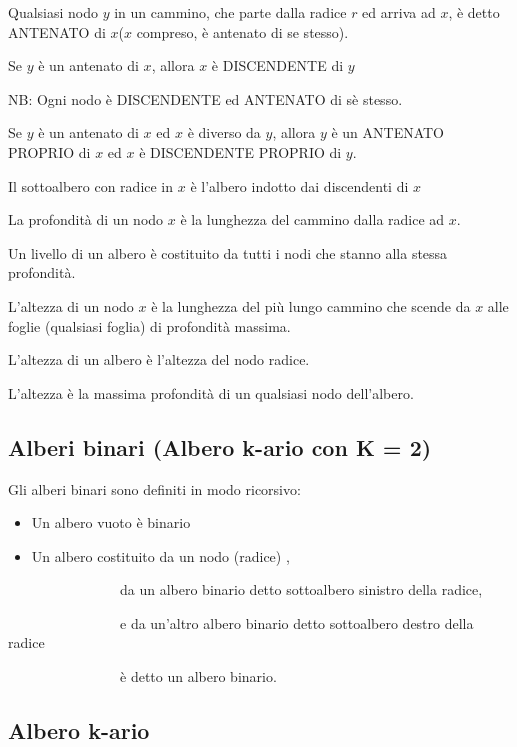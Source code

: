 \documentclass{article}
\providecommand{\tightlist}{%
  \setlength{\itemsep}{0pt}\setlength{\parskip}{0pt}}
\begin{document}
{Qualsiasi nodo $y$ in un cammino, che parte dalla radice $r$ ed arriva ad $x$, è detto ANTENATO di $x$($x$ compreso, è antenato di se stesso).}

{Se $y$ è un antenato di $x$, allora $x$ è DISCENDENTE di $y$}

{NB: Ogni nodo è DISCENDENTE ed ANTENATO di sè stesso.}

{Se $y$ è un antenato di $x$ ed $x$ è diverso da $y$, allora $y$ è un ANTENATO PROPRIO di $x$ ed $x$ è DISCENDENTE PROPRIO di $y$.}

{Il sottoalbero con radice in $x$ è l'albero indotto dai discendenti di $x$}

{La profondità di un nodo $x$ è la lunghezza del cammino dalla radice ad $x$.}

{Un livello di un albero è costituito da tutti i nodi che stanno alla stessa profondità. }

{L'altezza di un nodo $x$ è la lunghezza del più lungo cammino che scende da $x$ alle foglie (qualsiasi foglia) di profondità massima.}

{L'altezza di un albero è l'altezza del nodo radice.}

{L'altezza è la massima profondità di un qualsiasi nodo dell'albero.}

\hypertarget{h.rmzlh8kpnju}{\subsection{\texorpdfstring{{Alberi binari
(Albero k-ario con K =
2)}}{Alberi binari (Albero k-ario con K = 2)}}\label{h.rmzlh8kpnju}}

{Gli alberi binari sono definiti in modo ricorsivo:}

\begin{itemize}
\tightlist
\item
  {Un albero vuoto è binario}
\item
  {Un albero costituito da un nodo (radice) ,}
\end{itemize}

{~~~~~~~~~~~~~~~~da un albero binario detto sottoalbero sinistro della
radice,}

{~~~~~~~~~~~~~~~~e da un'altro albero binario detto sottoalbero destro
della radice}

{~~~~~~~~~~~~~~~~è detto un albero binario.}

{}

\hypertarget{h.chua2o837in5}{\subsection{\texorpdfstring{{Albero
k-ario}}{Albero k-ario}}\label{h.chua2o837in5}}
\end{document}

